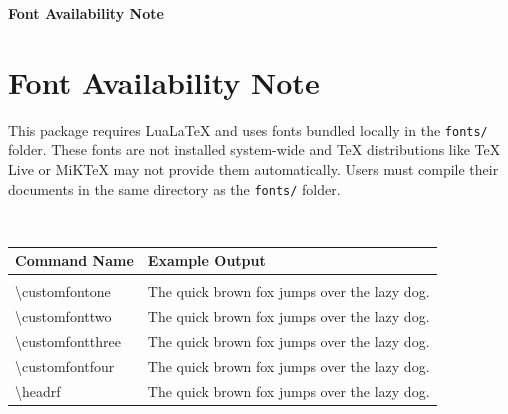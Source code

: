 \documentclass[10pt,twoside]{article}
\begin{document}
{    
    
  	\newpage
  	\fancyhead[RO]{\textcolor{accent}{\large\textbf{\thepage}}}
  	\fancyhead[LE]{\textcolor{accent}{\large\textbf{\thepage}}}
  	
  	{\fontsize{15}{15}\selectfont \textbf{\textcolor{accent}{\textsf{{Font Availability Note}}}}}\\
  	\vskip 0.4cm
  	 	\section*{Font Availability Note}
  	 	This package requires LuaLaTeX and uses fonts bundled locally in the \texttt{fonts/} folder. These fonts are not installed system-wide and TeX distributions like TeX Live or MiKTeX may not provide them automatically. Users must compile their documents in the same directory as the \texttt{fonts/} folder.
  	 	\\
  	 	\begin{tcolorbox}[colback=blue!5!white, width=\textwidth, opacityfill=0.1]
  	 		{\fontsize{14}{14}\selectfont {Custom fonts}}\\
  	 		\begin{tabular}{l m{10cm}}
  	 			\textbf{Command Name} & \textbf{Example Output} \\
  	 			\hline\\
  	 			\textbackslash customfontone & {\customfontone The quick brown fox jumps over the lazy dog.} \\
  	 			\textbackslash customfonttwo & {\customfonttwo The quick brown fox jumps over the lazy dog.} \\
  	 			\textbackslash customfontthree & {\customfontthree The quick brown fox jumps over the lazy dog.} \\
  	 			\textbackslash customfontfour & {\customfontfour The quick brown fox jumps over the lazy dog.} \\
  	 			\textbackslash headrf & {\headrf The quick brown fox jumps over the lazy dog.} \\
  	 		\end{tabular}
  	 		

\end{tcolorbox}}
\end{document}

